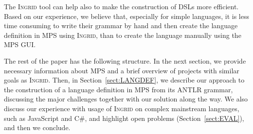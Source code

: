 The \textsc{Ingrid} tool can help also to make the construction of DSLs more efficient.
Based on our experience, we believe that, especially for simple languages, it is less time consuming to write their grammar by hand and then create the language definition in MPS using \textsc{Ingrid}, than to create the language manually using the MPS GUI.


The rest of the paper has the following structure.
In the next section, we provide necessary information about MPS and a brief overview of projects with similar goals as \textsc{Ingrid}.
Then, in Section~\ref{sect:LANGDEF}, we describe our approach to the construction of a language definition in MPS from its ANTLR grammar, discussing the major challenges together with our solution along the way.
We also discuss our experience with usage of \textsc{Ingrid} on complex mainstream languages, such as JavaScript and C\#, and highlight open problems (Section~\ref{sect:EVAL}), and then we conclude.

